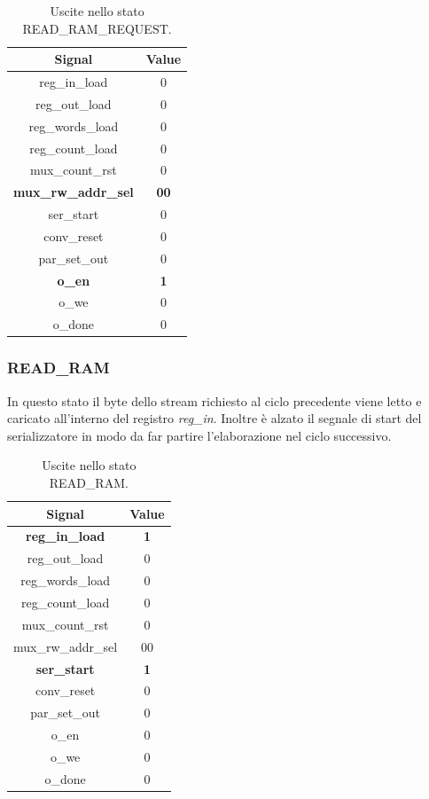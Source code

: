 \documentclass[a4paper]{report}
\begin{document}
\begin{table}[H]
  \centering
  \begin{tabular}{||c | c||} 
    \hline
    Signal & Value \\
    \hline\hline
    reg\_in\_load & 0 \\
    reg\_out\_load & 0 \\
    reg\_words\_load & 0 \\
    reg\_count\_load & 0 \\
    mux\_count\_rst & 0 \\
    \textbf{mux\_rw\_addr\_sel} & \textbf{00} \\
    ser\_start & 0 \\
    conv\_reset & 0 \\
    par\_set\_out & 0 \\
    \textbf{o\_en} & \textbf{1} \\
    o\_we & 0 \\
    o\_done & 0 \\
   \hline
  \end{tabular}
  \caption{Uscite nello stato READ\_RAM\_REQUEST.}
  \label{table:4}
\end{table}

\subsubsection{READ\_RAM}
In questo stato il byte dello stream richiesto al ciclo precedente viene letto e caricato all'interno del registro \textit{reg\_in}. Inoltre è alzato il segnale di start del serializzatore in modo da far partire l'elaborazione nel ciclo successivo.

\begin{table}[H]
  \centering
  \begin{tabular}{||c | c||} 
    \hline
    Signal & Value \\
    \hline\hline
    \textbf{reg\_in\_load} & \textbf{1} \\
    reg\_out\_load & 0 \\
    reg\_words\_load & 0 \\
    reg\_count\_load & 0 \\
    mux\_count\_rst & 0 \\
    mux\_rw\_addr\_sel & 00 \\
    \textbf{ser\_start} & \textbf{1} \\
    conv\_reset & 0 \\
    par\_set\_out & 0 \\
    o\_en & 0 \\
    o\_we & 0 \\
    o\_done & 0 \\
   \hline
  \end{tabular}
  \caption{Uscite nello stato READ\_RAM.}
  \label{table:5}
\end{table}
\end{document}
